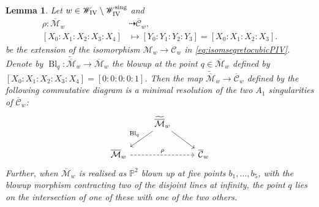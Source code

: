 \documentclass[a4paper,reqno]{amsart}
\numberwithin{equation}{section}
\newcommand{\p}{\mathbb{P}}
\newtheorem{lemma}[theorem]{Lemma}
\numberwithin{equation}{section}
\begin{document}
    \begin{lemma} \label{lem:segretocubicPIV}
Let $w\in \mathscr{W}_{\rm{IV}}\setminus \mathscr{W}_{\rm{IV}}^{\operatorname{sing}}$ and 
    \begin{equation} \label{eq:rhobirationalsegretocubicPIV}
    \begin{aligned}
        \rho : \overline{\mathcal{M}}_w &\dashrightarrow \overline{\mathcal{C}}_w,\\
        [X_0:X_1:X_2:X_3:X_4] &\mapsto [Y_0:Y_1:Y_2:Y_3]= [X_0:X_1:X_2:X_3].
    \end{aligned}
    \end{equation}
     be the extension of the isomorphism $\mathcal{M}_w\to\mathcal{C}_w$ in \eqref{eq:isomsegretocubicPIV}.
    Denote by $\operatorname{Bl}_q : \widetilde{\overline{\mathcal{M}}}_w\to \overline{\mathcal{M}}_w$ the blowup at the point $q\in \overline{\mathcal{M}}_w$ defined by $[X_0:X_1:X_2:X_3:X_4]=[0:0:0:0:1]$.
    Then the map $\widetilde{\overline{\mathcal{M}}}_w \to \overline{\mathcal{C}}_w$ defined by the following commutative diagram is a minimal resolution of the two $A_1$ singularities of $\overline{\mathcal{C}}_w$:
    \begin{equation*} 
        \begin{tikzcd}
            &   \widetilde{\overline{\mathcal{M}}}_w \arrow[dl,swap,  "\operatorname{Bl}_{q}"] \arrow[dr] & \\
            \overline{\mathcal{M}}_w  \arrow[rr,dashed, "\rho"]& & \overline{\mathcal{C}}_w
        \end{tikzcd}
    \end{equation*}
    Further, 
    when $\overline{\mathcal{M}}_w$ is realised as $\p^2$ blown up at five points $b_1,\dots,b_5$, with the blowup morphism contracting two of the disjoint lines at infinity, the point $q$ lies on the intersection of one of these with one of the two others.
\end{lemma}
\end{document}
